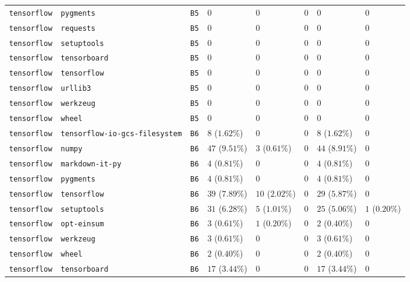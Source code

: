 \begin{table}
\begin{tabular}{llllllll}
\texttt{tensorflow} & \texttt{pygments} & \texttt{B5} & $0$ & $0$ & $0$ & $0$ & $0$ \\
\texttt{tensorflow} & \texttt{requests} & \texttt{B5} & $0$ & $0$ & $0$ & $0$ & $0$ \\
\texttt{tensorflow} & \texttt{setuptools} & \texttt{B5} & $0$ & $0$ & $0$ & $0$ & $0$ \\
\texttt{tensorflow} & \texttt{tensorboard} & \texttt{B5} & $0$ & $0$ & $0$ & $0$ & $0$ \\
\texttt{tensorflow} & \texttt{tensorflow} & \texttt{B5} & $0$ & $0$ & $0$ & $0$ & $0$ \\
\texttt{tensorflow} & \texttt{urllib3} & \texttt{B5} & $0$ & $0$ & $0$ & $0$ & $0$ \\
\texttt{tensorflow} & \texttt{werkzeug} & \texttt{B5} & $0$ & $0$ & $0$ & $0$ & $0$ \\
\texttt{tensorflow} & \texttt{wheel} & \texttt{B5} & $0$ & $0$ & $0$ & $0$ & $0$ \\
\texttt{tensorflow} & \texttt{tensorflow-io-gcs-filesystem} & \texttt{B6} & $8$ ($1.62\%$) & $0$ & $0$ & $8$ ($1.62\%$) & $0$ \\
\texttt{tensorflow} & \texttt{numpy} & \texttt{B6} & $47$ ($9.51\%$) & $3$ ($0.61\%$) & $0$ & $44$ ($8.91\%$) & $0$ \\
\texttt{tensorflow} & \texttt{markdown-it-py} & \texttt{B6} & $4$ ($0.81\%$) & $0$ & $0$ & $4$ ($0.81\%$) & $0$ \\
\texttt{tensorflow} & \texttt{pygments} & \texttt{B6} & $4$ ($0.81\%$) & $0$ & $0$ & $4$ ($0.81\%$) & $0$ \\
\texttt{tensorflow} & \texttt{tensorflow} & \texttt{B6} & $39$ ($7.89\%$) & $10$ ($2.02\%$) & $0$ & $29$ ($5.87\%$) & $0$ \\
\texttt{tensorflow} & \texttt{setuptools} & \texttt{B6} & $31$ ($6.28\%$) & $5$ ($1.01\%$) & $0$ & $25$ ($5.06\%$) & $1$ ($0.20\%$) \\
\texttt{tensorflow} & \texttt{opt-einsum} & \texttt{B6} & $3$ ($0.61\%$) & $1$ ($0.20\%$) & $0$ & $2$ ($0.40\%$) & $0$ \\
\texttt{tensorflow} & \texttt{werkzeug} & \texttt{B6} & $3$ ($0.61\%$) & $0$ & $0$ & $3$ ($0.61\%$) & $0$ \\
\texttt{tensorflow} & \texttt{wheel} & \texttt{B6} & $2$ ($0.40\%$) & $0$ & $0$ & $2$ ($0.40\%$) & $0$ \\
\texttt{tensorflow} & \texttt{tensorboard} & \texttt{B6} & $17$ ($3.44\%$) & $0$ & $0$ & $17$ ($3.44\%$) & $0$ \\

\end{tabular}
\end{table}

